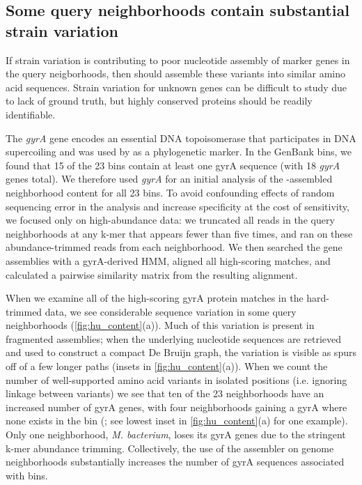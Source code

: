 \subsection*{Some query neighborhoods contain substantial strain variation}

If strain variation is contributing to poor nucleotide assembly of
marker genes in the query neigborhoods, then \plass should
assemble these variants into similar amino acid sequences.
Strain variation for unknown genes can be difficult to study due to
lack of ground truth, but highly conserved proteins should be readily
identifiable.

The {\em gyrA} gene encodes an essential DNA topoisomerase that
participates in DNA supercoiling and was used by \cite{Hu2016} as a
phylogenetic marker.  In the GenBank bins, we found that 15 of the 23
bins contain at least one gyrA sequence (with 18 {\em gyrA} genes
total).  We therefore used {\em gyrA} for an initial analysis of the
\plass-assembled neighborhood content for all 23 bins.  To avoid confounding effects of
random sequencing error in the analysis and increase specificity at the
cost of sensitivity, we focused only on high-abundance data:
we truncated all reads
in the query neighborhoods at any k-mer that appears fewer than five
times, and ran \plass on these abundance-trimmed reads from each
neighborhood.  We then searched the gene assemblies with a gyrA-derived
HMM, aligned all high-scoring matches, and calculated a pairwise similarity
matrix from the resulting alignment.

When we examine all of the high-scoring gyrA protein matches in the
hard-trimmed data, we see
considerable sequence variation in some query neighborhoods
(\autoref{fig:hu_content}(a)). Much of this variation is present in
fragmented \plass assemblies; when the underlying nucleotide sequences
are retrieved and used to construct a compact De Bruijn graph, the
variation is visible as spurs off of a few longer paths (insets in
\autoref{fig:hu_content}(a)). When we count the number of
well-supported amino acid variants in isolated positions (i.e. ignoring linkage between variants)
we see that ten of the 23 neighborhoods have an increased number of gyrA
genes, with four neighborhoods gaining a gyrA where none exists in
the bin (; see lowest inset
in \autoref{fig:hu_content}(a) for one example). Only one
neighborhood, {\em M. bacterium}, loses its gyrA genes due to the
stringent k-mer abundance trimming.
Collectively, the use of the \plass assembler on genome
neighborhoods substantially increases the number of gyrA sequences associated with bins.


